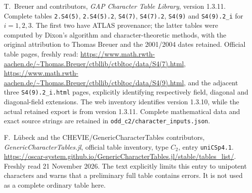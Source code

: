 T.~Breuer and contributors, \emph{GAP Character Table Library},
version 1.3.11. Complete tables \texttt{2.S4(5)},
\texttt{2.S4(5).2}, \texttt{S4(7)}, \texttt{S4(7).2},
\texttt{S4(9)} and \texttt{S4(9).2\_i} for $i=1,2,3$.
The first two have ATLAS provenance; the latter tables were computed
by Dixon's algorithm and character-theoretic methods, with the
original attribution to Thomas Breuer and the 2001/2004 dates retained.
Official table pages, freshly read:
\url{https://www.math.rwth-aachen.de/~Thomas.Breuer/ctbllib/ctbltoc/data/S4(7).html},
\url{https://www.math.rwth-aachen.de/~Thomas.Breuer/ctbllib/ctbltoc/data/S4(9).html},
and the adjacent three \texttt{S4(9).2\_i.html} pages, explicitly
identifying respectively field, diagonal and diagonal-field extensions.
The web inventory identifies version 1.3.10, while the actual retained
export is from version 1.3.11. Complete mathematical data and exact
source strings are retained in \texttt{odd\_c2/character\_inputs.json}.

F.~L\"ubeck and the CHEVIE/GenericCharacterTables contributors,
\emph{GenericCharacterTables.jl}, official table inventory,
type $C_2$, entry \texttt{uniCSp4.1}.
\url{https://oscar-system.github.io/GenericCharacterTables.jl/stable/tables_list/}.
Freshly read 21 November 2026. The text explicitly limits this entry
to unipotent characters and warns that a preliminary full table
contains errors. It is not used as a complete ordinary table here.

